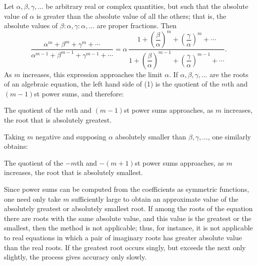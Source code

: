 \documentclass[11pt]{article}
\begin{document}
Let $\alpha,\beta,\gamma,\ldots$ be arbitrary real or complex quantities, but such that the absolute value of $\alpha$ is greater than the absolute value of all the others; that is, the absolute values of $\beta:\alpha,\gamma:\alpha,\ldots$ are proper fractions. Then
\begin{equation}
\frac{\alpha^m+\beta^m+\gamma^m+\cdots}
     {\alpha^{m-1}+\beta^{m-1}+\gamma^{m-1}+\cdots}
=
\alpha\,
\frac{1+\left(\dfrac{\beta}{\alpha}\right)^m+
        \left(\dfrac{\gamma}{\alpha}\right)^m+\cdots}
     {1+\left(\dfrac{\beta}{\alpha}\right)^{m-1}+
        \left(\dfrac{\gamma}{\alpha}\right)^{m-1}+\cdots}.
\tag{1}
\end{equation}
As $m$ increases, this expression approaches the limit $\alpha$. If $\alpha,\beta,\gamma,\ldots$ are the roots of an algebraic equation, the left hand side of (1) is the quotient of the $m$th and $(m-1)$st power sums, and therefore:

The quotient of the $m$th and $(m-1)$st power sums approaches, as $m$ increases, the root that is absolutely greatest.

Taking $m$ negative and supposing $\alpha$ absolutely smaller than $\beta,\gamma,\ldots$, one similarly obtains:

The quotient of the $-m$th and $-(m+1)$st power sums approaches, as $m$ increases, the root that is absolutely smallest.

Since power sums can be computed from the coefficients as symmetric functions, one need only take $m$ sufficiently large to obtain an approximate value of the absolutely greatest or absolutely smallest root. If among the roots of the equation there are roots with the same absolute value, and this value is the greatest or the smallest, then the method is not applicable; thus, for instance, it is not applicable to real equations in which a pair of imaginary roots has greater absolute value than the real roots. If the greatest root occurs singly, but exceeds the next only slightly, the process gives accuracy only slowly.
\end{document}
